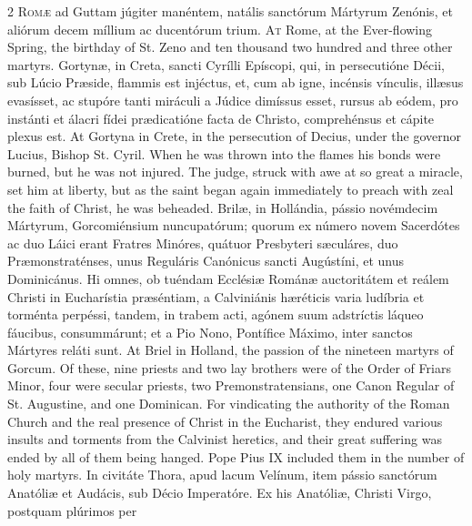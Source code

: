 \begin{paracol}{2}
\lettrine[lines=2]{R}{omæ} ad Guttam júgiter 
 manéntem, natális sanctórum Mártyrum Zenónis, et aliórum decem míllium ac 
 ducentórum trium.
\switchcolumn
{}
\lettrine[lines=2]{A}{t} Rome, at the Ever-flowing Spring, 
 the birthday of St. Zeno and ten thousand two hundred and three other 
 martyrs.
\switchcolumn*
{}
Gortynæ, in Creta, 
 sancti Cyrílli Epíscopi, qui, in persecutióne Décii, sub Lúcio Præside, 
 flammis est injéctus, et, cum ab igne, incénsis vínculis, illæsus evasísset, 
 ac stupóre tanti miráculi a Júdice dimíssus esset, rursus ab eódem, pro 
 instánti et álacri fídei prædicatióne facta de Christo, comprehénsus et 
 cápite plexus est.
\switchcolumn
{}
At Gortyna in Crete, in the 
 persecution of Decius, under the governor Lucius, Bishop St. Cyril. 
 When he was thrown into the flames his bonds were burned, but he was not 
 injured. The judge, struck with awe at so great a miracle, set him at 
 liberty, but as the saint began again immediately to preach with zeal the 
 faith of Christ, he was beheaded.
\switchcolumn*
{}
Brilæ, in Hollándia, 
 pássio novémdecim Mártyrum, Gorcomiénsium nuncupatórum; quorum ex número 
 novem Sacerdótes ac duo Láici erant Fratres Minóres, quátuor Presbyteri 
 sæculáres, duo Præmonstraténses, unus Reguláris Canónicus sancti Augústíni, 
 et unus Dominicánus. Hi omnes, ob tuéndam Ecclésiæ Románæ auctoritátem 
 et reálem Christi in Eucharístia præséntiam, a Calviniánis hæréticis varia 
 ludíbria et torménta perpéssi, tandem, in trabem acti, agónem suum 
 adstríctis láqueo fáucibus, consummárunt; et a Pio Nono, Pontífice Máximo, 
 inter sanctos Mártyres reláti sunt.
\switchcolumn
{}
At Briel in Holland, the passion of 
 the nineteen martyrs of Gorcum. Of these, nine priests and two lay 
 brothers were of the Order of Friars Minor, four were secular priests, two 
 Premonstratensians, one Canon Regular of St. Augustine, and one Dominican. 
 For vindicating the authority of the Roman Church and the real presence of 
 Christ in the Eucharist, they endured various insults and torments from the 
 Calvinist heretics, and their great suffering was ended by all of them being 
 hanged. Pope Pius IX included them in the number of holy martyrs.
\switchcolumn*
{}
In civitáte Thora, apud 
 lacum Velínum, item pássio sanctórum Anatóliæ et Audácis, sub Décio 
 Imperatóre. Ex his Anatóliæ, Christi Virgo, postquam plúrimos per 

\end{paracol}
